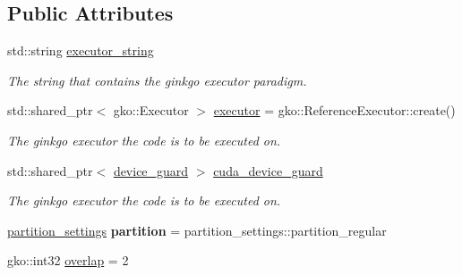 \subsection*{Public Attributes}
\begin{DoxyCompactItemize}
\item 
\mbox{\label{structschwz_1_1Settings_a088ed3524456a1fd40e76b0e2d624c79}} 
std\+::string \hyperlink{structschwz_1_1Settings_a088ed3524456a1fd40e76b0e2d624c79}{executor\+\_\+string}
\begin{DoxyCompactList}\small\item\em The string that contains the ginkgo executor paradigm. \end{DoxyCompactList}\item 
\mbox{\label{structschwz_1_1Settings_a6920db9b39120b83399743083f17691f}} 
std\+::shared\+\_\+ptr$<$ gko\+::\+Executor $>$ \hyperlink{structschwz_1_1Settings_a6920db9b39120b83399743083f17691f}{executor} = gko\+::\+Reference\+Executor\+::create()
\begin{DoxyCompactList}\small\item\em The ginkgo executor the code is to be executed on. \end{DoxyCompactList}\item 
\mbox{\label{structschwz_1_1Settings_ae32b9a9c03095a47810aa2fc0915eec7}} 
std\+::shared\+\_\+ptr$<$ \hyperlink{classschwz_1_1device__guard}{device\+\_\+guard} $>$ \hyperlink{structschwz_1_1Settings_ae32b9a9c03095a47810aa2fc0915eec7}{cuda\+\_\+device\+\_\+guard}
\begin{DoxyCompactList}\small\item\em The ginkgo executor the code is to be executed on. \end{DoxyCompactList}\item 
\mbox{\label{structschwz_1_1Settings_ac1e336d221bc2238a5e020900d7ae4c8}} 
\hyperlink{structschwz_1_1Settings_a11769093e4aa3ce3340cbf7a67487faa}{partition\+\_\+settings} {\bfseries partition} = partition\+\_\+settings\+::partition\+\_\+regular
\item 
\mbox{\label{structschwz_1_1Settings_acf1f443835c2ac601782827f512bdd05}} 
gko\+::int32 \hyperlink{structschwz_1_1Settings_acf1f443835c2ac601782827f512bdd05}{overlap} = 2

\end{DoxyCompactItemize}

